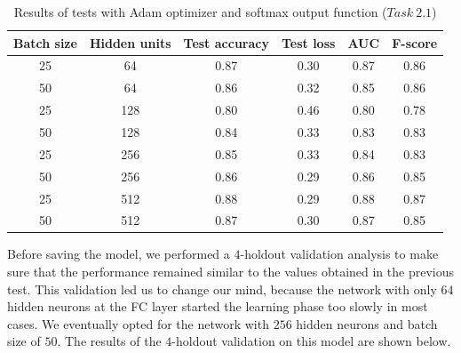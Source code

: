 \documentclass[11pt,a4paper,oneside]{article}
\begin{document}
\begin{table}[h]
\centering
\begin{tabular}{|cccccc|}
\hline
Batch size & Hidden units & Test accuracy & Test loss & AUC & F-score \\
\hline
25 & 64 & 0.87 & 0.30 & 0.87 & 0.86 \\ 
50 & 64 & 0.86 & 0.32 & 0.85 & 0.86 \\ 
25 & 128 & 0.80 & 0.46 & 0.80 & 0.78 \\ 
50 & 128 & 0.84 & 0.33 & 0.83 & 0.83 \\ 
25 & 256 & 0.85 & 0.33 & 0.84 & 0.83 \\ 
50 & 256 & 0.86 & 0.29 & 0.86 & 0.85 \\ 
25 & 512 & 0.88 & 0.29 & 0.88 & 0.87 \\ 
50 & 512 & 0.87 & 0.30 & 0.87 & 0.85 \\
\hline
\end{tabular}
\caption{Results of tests with Adam optimizer and softmax output function ($Task\ 2.1$)}
\end{table}

Before saving the model, we performed a $4$-holdout validation analysis to make sure that the performance remained similar to the values obtained in the previous test. 
This validation led us to change our mind, because the network with only $64$ hidden neurons at the FC layer started the learning phase too slowly in most cases. We eventually opted for the network with $256$ hidden neurons and batch size of $50$. The results of the $4$-holdout validation on this model are shown below.

\clearpage
\end{document}
